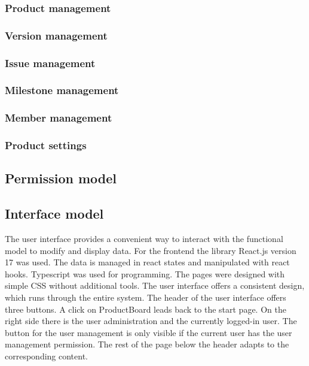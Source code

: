     \subsubsection*{Product management}
    \subsubsection*{Version management}
    \subsubsection*{Issue management} 
    \subsubsection*{Milestone management}
    \subsubsection*{Member management}
    \subsubsection*{Product settings}
 

    \subsection*{Permission model}



    \subsection*{Interface model} 
    The user interface provides a convenient way to interact with the functional model to modify and display data. For the frontend the library React.js version 17 was used. The data is managed in react states and manipulated with react hooks. Typescript was used for programming. The pages were designed with simple CSS without additional tools. The user interface offers a consistent design, which runs through the entire system. The header of the user interface offers three buttons. A click on ProductBoard leads back to the start page. On the right side there is the user administration and the currently logged-in user. The button for the user management is only visible if the current user has the user management permission. The rest of the page below the header adapts to the corresponding content.


